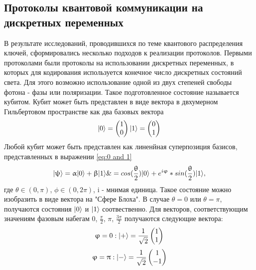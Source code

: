 \subsection{Протоколы квантовой коммуникации на дискретных переменных }\label{sec:ch1/sect2/DVQKD prot}
 В результате исследований, проводившихся по теме квантового распределения ключей, сформировались несколько подходов к реализации протоколов. Первыми протоколами были протоколы на использовании дискретных переменных, в которых для кодирования  используется конечное число дискретных состояний света. Для этого возможно использование одной из двух степеней свободы фотона - фазы или поляризации. Такое подготовленное состояние называется кубитом. Кубит может быть представлен в виде вектора в двхумерном Гильбертовом пространстве как два базовых вектора
\begin{equation}
  \lvert0\rangle       =  \begin{pmatrix} 1 \\ 0 \end{pmatrix}
  \lvert1\rangle       =  \begin{pmatrix} 0 \\ 1 \end{pmatrix}
\end{equation}\label{eq:0 and 1}
Любой кубит может быть представлен как линенйная суперпозиция базисов, представленных в выражении \ref{eq:0 and 1}
\begin{equation}
    \lvert\uppsi\rangle      = \upalpha\lvert0\rangle + \upbeta\lvert1\rangle \&=  cos(\frac{\uptheta}{2})\lvert0\rangle + e^{i\upvarphi} * sin(\frac{\uptheta}{2})\lvert1\rangle, 
\end{equation}\label{eq: superpos}
где $\theta \in (0, \pi)$, $\phi \in (0, 2\pi)$, i - мнимая единица. Такое состояние можно изобразить в виде вектора на "Сфере Блоха". В случае $\theta = 0 $ или $\theta = \pi $, получаются состояния $\lvert0\rangle$ и $\lvert1\rangle$ соотвественно. Для векторов, соответствующим значениям фазовым набегам {0, $\frac{\pi}{2}$, $\pi$, $\frac{3\pi}{2}$} получаются следующие вектора:
\begin{equation}
  \upvarphi = 0 : \lvert+\rangle= \frac{1}{\sqrt{2}} \begin{pmatrix} 1 \\ 1 \end{pmatrix}
\end{equation}\label{eq:0 phase vector}
\begin{equation}
  \upvarphi = \uppi : \lvert-\rangle= \frac{1}{\sqrt{2}} \begin{pmatrix} 1 \\ -1 \end{pmatrix}
\end{equation}\label{eq:pi phase vector}
